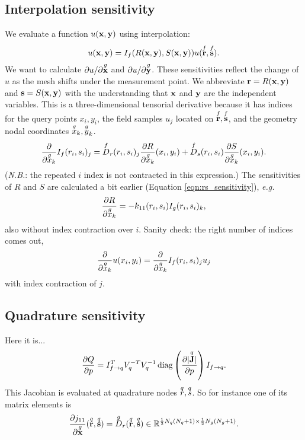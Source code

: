 \subsection{Interpolation sensitivity}

We evaluate a function $u(\textbf{x}, \textbf{y})$ using interpolation:
%
\begin{equation}
u(\textbf{x}, \textbf{y}) = I_f(R(\textbf{x}, \textbf{y}), S(\textbf{x}, \textbf{y})) u(\overset{f}{\textbf{r}}, \overset{f}{\textbf{s}}).
\end{equation}
%
We want to calculate $\partial{u}/\partial{\overset{g}{\textbf{x}}}$ and $\partial{u}/\partial{\overset{g}{\textbf{y}}}$.  These sensitivities reflect the change of $u$ as the mesh shifts under the measurement point.  We abbreviate $\textbf{r} = R(\textbf{x}, \textbf{y})$ and $\textbf{s} = S(\textbf{x}, \textbf{y})$ with the understanding that $\textbf{x}$ and $\textbf{y}$ are the independent variables.  This is a three-dimensional tensorial derivative because it has indices for the query points $x_i, y_i$, the field samples $u_j$ located on $\overset{f}{\textbf{r}}, \overset{f}{\textbf{s}}$, and the geometry nodal coordinates $\overset{g}{x}_k, \overset{g}{y}_k$.
%
\begin{equation}
\label{eqn:curvilinear_interpolation_sensitivity}
\frac{\partial{}}{\partial{\overset{g}{x}_k}} I_f(r_i, s_i)_j = \overset{f}{D}_r(r_i, s_i)_j \frac{\partial{R}}{\partial{\overset{g}{x}_k}}(x_i, y_i) + \overset{f}{D}_s(r_i, s_i) \frac{\partial{S}}{\partial{\overset{g}{x}_k}}(x_i, y_i).
\end{equation}
%
(\emph{N.B.}: the repeated $i$ index is not contracted in this expression.)  The sensitivities of $R$ and $S$ are calculated a bit earlier (Equation \ref{eqn:rs_sensitivity}), \emph{e.g.}
%
\begin{equation}
\frac{\partial{R}}{\partial{\overset{g}{x}_k}} = -k_{11}(r_i, s_i) I_g(r_i, s_i)_k,
\end{equation}
%
also without index contraction over $i$.  Sanity check: the right number of indices comes out,
%
\begin{equation}
\frac{\partial{}}{\partial{\overset{g}{x}_k}}u(x_i, y_i) = \frac{\partial{}}{\partial{\overset{g}{x}_k}} I_f(r_i, s_i)_j u_j
\end{equation}
%
with index contraction of $j$.


\subsection{Quadrature sensitivity}

Here it is...
%
\begin{equation}
\frac{\partial{Q}}{\partial{p}} = I_{f \rightarrow q}^T V_q^{-T} V_q^{-1} \operatorname{diag} \left(  \frac{\partial{| \overset{q}{\textbf{J}} |}}{\partial{p}} \right) I_{f \rightarrow q}.
\end{equation}
%
This Jacobian is evaluated at quadrature nodes $\overset{q}{r}, \overset{q}{s}$.  So for instance one of its matrix elements is
%
\begin{equation}
\frac{\partial{j_{11}}}{\partial{\overset{g}{\textbf{x}}}}(\overset{q}{\textbf{r}}, \overset{q}{\textbf{s}}) = \overset{g}{D}_r(\overset{q}{\textbf{r}}, \overset{q}{\textbf{s}}) \in \mathbb{R}^{\frac{1}{2}N_q(N_q+1) \times \frac{1}{2}N_g(N_g+1)}.
\end{equation}

